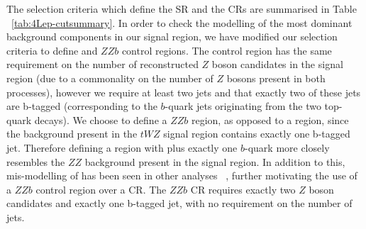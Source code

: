 The selection criteria which define the SR and the CRs are summarised in Table ~\ref{tab:4Lep-cutsummary}. In order to check the modelling of the most dominant background components in our signal region, we have modified our selection criteria to define \ttZ and $ZZb$ control regions. The \ttZ control region has the same requirement on the number of reconstructed $Z$ boson candidates in the signal region (due to a commonality on the number of $Z$ bosons present in both processes), however we require at least two jets and that exactly two of these jets are b-tagged (corresponding to the $b$-quark jets originating from the two top-quark decays). We choose to define a $ZZb$ region, as opposed to a \ZZ region, since the \ZZ background present in the $tWZ$ signal region contains exactly one b-tagged jet. Therefore defining a region with \ZZ plus exactly one $b$-quark more closely resembles the $ZZ$ background present in the signal region. In addition to this, mis-modelling of \ZZ has been seen in other analyses ~\cite{Aaboud:2019, ppToZZ:CMSpaper}, further motivating the use of a $ZZb$ control region over a \ZZ CR. The $ZZb$ CR requires exactly two $Z$ boson candidates and exactly one b-tagged jet, with no requirement on the number of jets.




